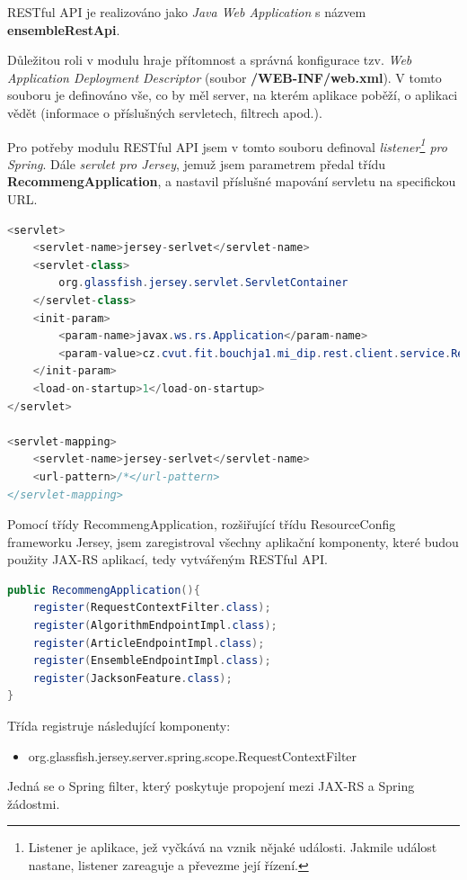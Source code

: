 \documentclass[thesis=M,czech]{FITthesis}[2014/05/07]
\begin{document}
RESTful API je realizováno jako \emph{Java Web Application} s názvem \textbf{ensembleRestApi}.

Důležitou roli v modulu hraje přítomnost a správná konfigurace tzv. \emph{Web Application Deployment Descriptor} (soubor \textbf{/WEB-INF/web.xml}). V tomto souboru je definováno vše, co by měl server, na kterém aplikace poběží, o aplikaci vědět (informace o příslušných servletech, filtrech apod.).

Pro potřeby modulu RESTful API jsem v tomto souboru definoval \emph{listener\footnote{Listener je aplikace, jež vyčkává na vznik nějaké události. Jakmile událost nastane, listener zareaguje a převezme její řízení.} pro Spring}. Dále \emph{servlet pro Jersey}, jemuž jsem parametrem předal třídu \textbf{RecommengApplication}, a nastavil příslušné mapování servletu na specifickou URL.

\begin{lstlisting}[language=java]
<servlet>
    <servlet-name>jersey-serlvet</servlet-name>
    <servlet-class>
        org.glassfish.jersey.servlet.ServletContainer
    </servlet-class>
    <init-param>
        <param-name>javax.ws.rs.Application</param-name>
        <param-value>cz.cvut.fit.bouchja1.mi_dip.rest.client.service.RecommengApplication</param-value>            
    </init-param>        
    <load-on-startup>1</load-on-startup>
</servlet>

<servlet-mapping>
    <servlet-name>jersey-serlvet</servlet-name>
    <url-pattern>/*</url-pattern>
</servlet-mapping>
\end{lstlisting}

Pomocí třídy RecommengApplication, rozšiřující třídu ResourceConfig frameworku Jersey, jsem zaregistroval všechny aplikační komponenty, které budou použity JAX-RS aplikací, tedy vytvářeným RESTful API.

\begin{lstlisting}[language=java]
public RecommengApplication(){
    register(RequestContextFilter.class);
    register(AlgorithmEndpointImpl.class);
    register(ArticleEndpointImpl.class);
    register(EnsembleEndpointImpl.class);
    register(JacksonFeature.class);        
}
\end{lstlisting}

Třída registruje následující komponenty:

\begin{itemize}
	\item org.glassfish.jersey.server.spring.scope.RequestContextFilter
\end{itemize}
	Jedná se o Spring filter, který poskytuje propojení mezi JAX-RS a Spring žádostmi.
\end{document}
